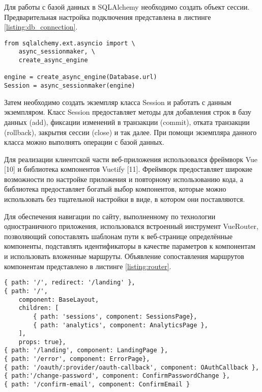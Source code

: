 Для работы с базой данных в SQLAlchemy необходимо создать объект сессии. Предварительная настройка подключения представлена в листинге \ref{listing:db_connection}.

\begin{lstlisting}[caption={Настройка подключения к базе данных}, label={listing:db_connection}]
from sqlalchemy.ext.asyncio import \
    async_sessionmaker, \
    create_async_engine
    
engine = create_async_engine(Database.url)
Session = async_sessionmaker(engine)
\end{lstlisting}

Затем необходимо создать экземпляр класса Session и работать с данным экземпляром. Класс Session предоставляет методы для добавления строк в базу данных (add), фиксации изменений в транзакции (commit), отката транзакции (rollback), закрытия сессии (close) и так далее. При помощи экземпляра данного класса можно выполнять операции с базой данных.

\SubsectionBetweenParagraphs{Реализация клиентской части веб-приложения}

Для реализации клиентской части веб-приложения использовался фреймворк Vue [10] и библиотека компонентов Vuetify [11]. Фреймворк предоставляет широкие возможности по настройке приложения и повторному использованию кода, а библиотека предоставляет богатый выбор компонентов, которые можно использовать без тщательной настройки в виде, в котором они поставляются.

Для обеспечения навигации по сайту, выполненному по технологии одностраничного приложения, использовался встроенный инструмент VueRouter, позволяющий сопоставлять шаблонам пути к веб-странице определённые компоненты, подставлять идентификаторы в качестве параметров к компонентам и использовать вложенные маршруты. Объявление сопоставления маршрутов компонентам представлено в листинге \ref{listing:router}.

\begin{lstlisting}[caption={Объявление сопоставления маршрутов компонентам}, label={listing:router}]
{ path: '/', redirect: '/landing' },
{ path: '/',
    component: BaseLayout,
    children: [
        { path: 'sessions', component: SessionsPage},
        { path: 'analytics', component: AnalyticsPage },
    ],
    props: true},
{ path: '/landing', component: LandingPage },
{ path: '/error', component: ErrorPage},
{ path: '/oauth/:provider/oauth-callback', component: OAuthCallback },
{ path:'/change-password', component: ConfirmPasswordChange },
{ path: '/confirm-email', component: ConfirmEmail }
\end{lstlisting}

